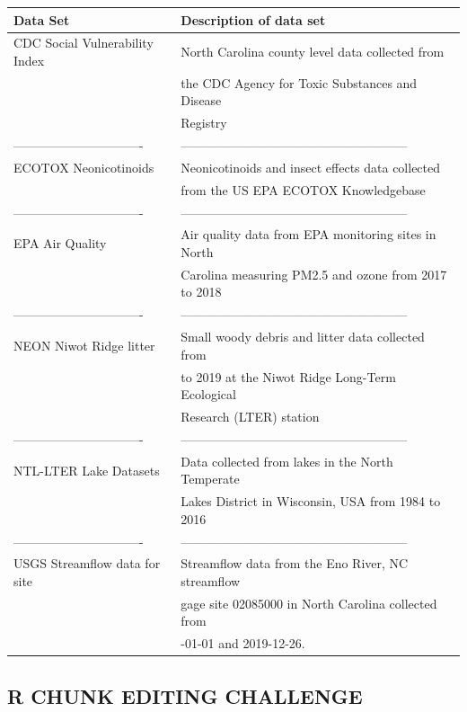 \documentclass[
]{article}
\begin{document}
\begin{longtable}[]{@{}
  >{\raggedright\arraybackslash}p{}
  >{\raggedright\arraybackslash}p{}@{}}
\toprule
Data Set & Description of data set \\
\midrule
\endhead
CDC Social Vulnerability Index & 2018 North Carolina county level data
collected from \\
& the CDC Agency for Toxic Substances and Disease \\
& Registry \\
------------------------------- &
------------------------------------------------------ \\
ECOTOX Neonicotinoids & Neonicotinoids and insect effects data
collected \\
& from the US EPA ECOTOX Knowledgebase \\
------------------------------- &
------------------------------------------------------ \\
EPA Air Quality & Air quality data from EPA monitoring sites in North \\
& Carolina measuring PM2.5 and ozone from 2017 to 2018 \\
------------------------------- &
------------------------------------------------------ \\
NEON Niwot Ridge litter & Small woody debris and litter data collected
from \\
& 2016 to 2019 at the Niwot Ridge Long-Term Ecological \\
& Research (LTER) station \\
------------------------------- &
------------------------------------------------------ \\
NTL-LTER Lake Datasets & Data collected from lakes in the North
Temperate \\
& Lakes District in Wisconsin, USA from 1984 to 2016 \\
------------------------------- &
------------------------------------------------------ \\
USGS Streamflow data for site & Streamflow data from the Eno River, NC
streamflow \\
02085000 & gage site 02085000 in North Carolina collected from \\
& 1928-01-01 and 2019-12-26. \\
\bottomrule
\end{longtable}

\hypertarget{r-chunk-editing-challenge}{%
\subsection{R CHUNK EDITING CHALLENGE}\label{r-chunk-editing-challenge}}
\end{document}
